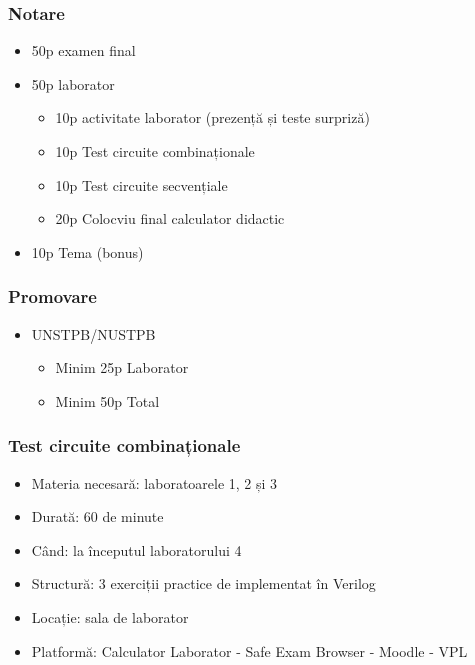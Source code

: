 
\begin{frame}
\frametitle{Notare}

\begin{itemize}
    \item 50p examen final
    \item 50p laborator
    \begin{itemize}
        \item 10p activitate laborator (prezență și teste surpriză)
        \item 10p Test circuite combinaționale
        \item 10p Test circuite secvențiale
        \item 20p Colocviu final calculator didactic
    \end{itemize}
    \item 10p Tema (bonus)
\end{itemize}
\end{frame}

\begin{frame}
\frametitle{Promovare}
    
\begin{itemize}
    \item UNSTPB/NUSTPB
    \begin{itemize}
        \item Minim 25p Laborator
        \item Minim 50p Total
    \end{itemize}
\end{itemize}
\end{frame}

\begin{frame}
\frametitle{Test circuite combinaționale}

\begin{itemize}
    \item Materia necesară: laboratoarele 1, 2 și 3
    \item Durată: 60 de minute
    \item Când: la începutul laboratorului 4
    \item Structură: 3 exerciții practice de implementat în Verilog
    \item Locație: sala de laborator
    \item Platformă: Calculator Laborator - Safe Exam Browser - Moodle - VPL
\end{itemize}
\end{frame}

